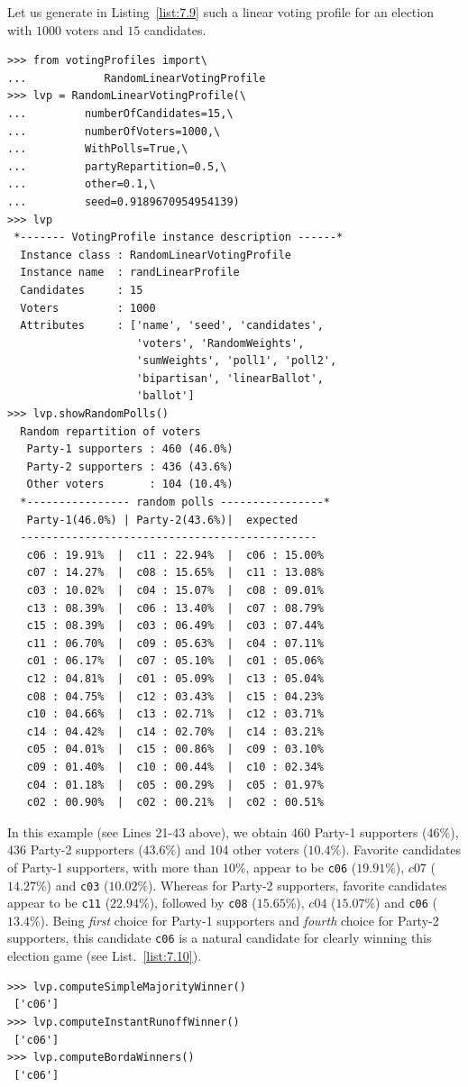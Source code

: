 Let us generate in Listing~\vref{list:7.9} such a linear voting profile for an election with $1000$ voters and $15$ candidates.
\begin{lstlisting}[caption={Generating a linear voting profile with random polls},label=list:7.9]
>>> from votingProfiles import\
...            RandomLinearVotingProfile
>>> lvp = RandomLinearVotingProfile(\
...         numberOfCandidates=15,\
...         numberOfVoters=1000,\
...         WithPolls=True,\
...         partyRepartition=0.5,\
...         other=0.1,\
...         seed=0.9189670954954139)
>>> lvp
 *------- VotingProfile instance description ------*
  Instance class : RandomLinearVotingProfile
  Instance name  : randLinearProfile
  Candidates     : 15
  Voters         : 1000
  Attributes     : ['name', 'seed', 'candidates',
                    'voters', 'RandomWeights',
                    'sumWeights', 'poll1', 'poll2',
                    'bipartisan', 'linearBallot',
                    'ballot']
>>> lvp.showRandomPolls()
  Random repartition of voters
   Party-1 supporters : 460 (46.0%)
   Party-2 supporters : 436 (43.6%)
   Other voters       : 104 (10.4%)
  *---------------- random polls ----------------*
   Party-1(46.0%) | Party-2(43.6%)|  expected  
  ----------------------------------------------
   c06 : 19.91%  |  c11 : 22.94%  |  c06 : 15.00%
   c07 : 14.27%  |  c08 : 15.65%  |  c11 : 13.08%
   c03 : 10.02%  |  c04 : 15.07%  |  c08 : 09.01%
   c13 : 08.39%  |  c06 : 13.40%  |  c07 : 08.79%
   c15 : 08.39%  |  c03 : 06.49%  |  c03 : 07.44%
   c11 : 06.70%  |  c09 : 05.63%  |  c04 : 07.11%
   c01 : 06.17%  |  c07 : 05.10%  |  c01 : 05.06%
   c12 : 04.81%  |  c01 : 05.09%  |  c13 : 05.04%
   c08 : 04.75%  |  c12 : 03.43%  |  c15 : 04.23%
   c10 : 04.66%  |  c13 : 02.71%  |  c12 : 03.71%
   c14 : 04.42%  |  c14 : 02.70%  |  c14 : 03.21%
   c05 : 04.01%  |  c15 : 00.86%  |  c09 : 03.10%
   c09 : 01.40%  |  c10 : 00.44%  |  c10 : 02.34%
   c04 : 01.18%  |  c05 : 00.29%  |  c05 : 01.97%
   c02 : 00.90%  |  c02 : 00.21%  |  c02 : 00.51%
\end{lstlisting}

In this example (see Lines 21-43 above), we obtain 460 Party-1 supporters ($46\%$), 436 Party-2 supporters ($43.6\%$) and 104 other voters ($10.4\%$). Favorite candidates of Party-1 supporters, with more than $10\%$, appear to be \texttt{c06} ($19.91\%$), $c07$ ($14.27\%$) and \texttt{c03} ($10.02\%$). Whereas for Party-2 supporters, favorite candidates appear to be \texttt{c11} ($22.94\%$), followed by \texttt{c08} ($15.65\%$), $c04$ ($15.07\%$) and \texttt{c06} ($13.4\%$). Being \emph{first} choice for Party-1 supporters and \emph{fourth} choice for Party-2 supporters, this candidate \texttt{c06} is a natural candidate for clearly winning this election game (see List.~\vref{list:7.10}).
\begin{lstlisting}[caption={The uninominal and \Borda election winner},label=list:7.10]
>>> lvp.computeSimpleMajorityWinner()
 ['c06']
>>> lvp.computeInstantRunoffWinner()
 ['c06']  
>>> lvp.computeBordaWinners()
 ['c06']
\end{lstlisting}

